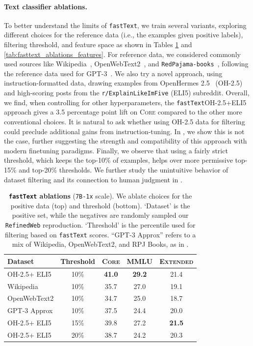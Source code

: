 \documentclass{article}
\newcommand{\oh}{\textsc{OH-2.5}\xspace}
\newcommand{\ltrack}{\texttt{7B-1x}\xspace}
\newcommand{\rpj}{\texttt{RedPajama}\xspace}
\newcommand{\rw}{\texttt{RefinedWeb}\xspace}
\newcommand{\fasttext}{\texttt{fastText}\xspace}
\newcommand{\lowvar}{\textsc{Core}\xspace}
\newcommand{\aggscore}{\textsc{Extended}\xspace}
\begin{document}
\paragraph{Text classifier ablations.}
To better understand the limits of \fasttext, we train several variants, exploring different choices for the reference data (i.e., the examples given positive labels), filtering threshold, and feature space as shown in Tables \ref{tab:fasttext_ablations} and \ref{tab:fasttext_ablations_features}.
For reference data, we considered commonly used sources like
Wikipedia~\citep{pile},
OpenWebText2~\citep{pile},
and \rpj{}\texttt{-books}~\citep{rpj},
following the reference data used for GPT-3~\citep{gpt3}.
We also try a novel approach, using instruction-formatted data, drawing examples from OpenHermes 2.5~\citep{openhermes} (\oh)
and high-scoring posts from the \texttt{r/ExplainLikeImFive} (ELI5) subreddit.
Overall, we find, when controlling for other hyperparameters, the \fasttext \oh+ELI5 approach gives a 3.5 percentage point lift on \lowvar compared to the other more conventional choices.
It is natural to ask whether using \oh data for filtering could preclude additional gains from instruction-tuning.
In , we show this is not the case, further suggesting the strength and compatibility of this approach with modern finetuning paradigms.
Finally, we observe that using a fairly strict threshold, which keeps the top-10\% of examples, helps over more permissive top-15\% and top-20\% thresholds. We further study the unintuitive behavior of dataset filtering and its connection to human judgment in .
\label{subsec:ablations}
\begin{table}[ht]
\centering
\caption{\textbf{\fasttext ablations} (\ltrack{} scale). We ablate choices for the positive data (top) and threshold (bottom).
`Dataset' is the positive set, while the negatives are randomly sampled our \rw reproduction.
`Threshold' is the percentile used for filtering based on \fasttext scores.
``GPT-3 Approx'' refers to a mix of Wikipedia, OpenWebText2, and RPJ Books, as in \citep{gpt3}.}
\label{tab:fasttext_ablations}

\begin{tabular}{lcccc}
\toprule
     Dataset & Threshold &       \lowvar &          MMLU &     \aggscore \\
\midrule
    \oh + ELI5 &      10\% & \textbf{41.0} & \textbf{29.2} &          21.4 \\
   Wikipedia &      10\% &          35.7 &          27.0 &          19.1 \\
OpenWebText2 &      10\% &          34.7 &          25.0 &          18.7 \\
GPT-3 Approx &      10\% &          37.5 &          24.4 &          20.0 \\
\midrule
    \oh + ELI5 &      15\% &          39.8 &          27.2 &          \textbf{21.5} \\
    \oh + ELI5 &      20\% &          38.7 &          24.2 &          20.3 \\\bottomrule
\end{tabular}

\end{table}
\end{document}
